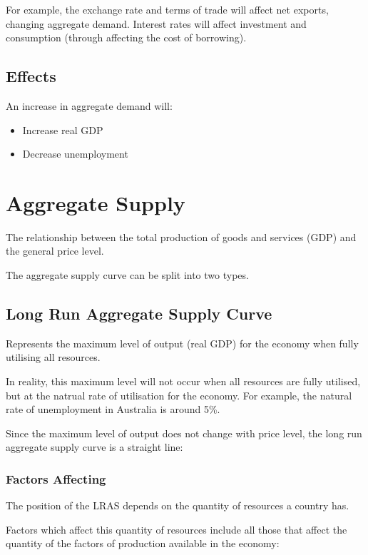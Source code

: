 \documentclass[a4paper,11pt]{article}
\begin{document}
For example, the exchange rate and terms of trade will affect net exports,
changing aggregate demand. Interest rates will affect investment and consumption
(through affecting the cost of borrowing).


\subsection{Effects}

An increase in aggregate demand will:

\begin{itemize}
\item Increase real GDP
\item Decrease unemployment
\end{itemize}




\section{Aggregate Supply}

The relationship between the total production of goods and services (GDP) and
the general price level.

The aggregate supply curve can be split into two types.


\subsection{Long Run Aggregate Supply Curve}

Represents the maximum level of output (real GDP) for the economy when fully
utilising all resources.

In reality, this maximum level will not occur when all resources are fully
utilised, but at the natrual rate of utilisation for the economy.  For example,
the natural rate of unemployment in Australia is around 5\%.

Since the maximum level of output does not change with price level, the long run
aggregate supply curve is a straight line:



\subsubsection{Factors Affecting}

The position of the LRAS depends on the quantity of resources a country has.

Factors which affect this quantity of resources include all those that affect
the quantity of the factors of production available in the economy:
\end{document}
